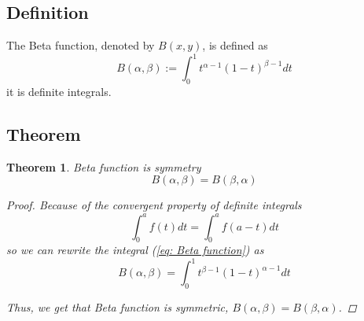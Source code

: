 \documentclass[a4paper]{article}
\newtheorem{theorem}{Theorem}[section]
\begin{document}
\subsection{Definition}
The Beta function, denoted by $B(x, y)$, is defined as
\begin{equation}
    B(\alpha, \beta) := \int_{0}^{1} t^{\alpha-1} (1-t)^{\beta-1} dt
    \label{eq: Beta function}
\end{equation}
it is definite integrals.

\subsection{Theorem}

\begin{theorem}
    Beta function is symmetry
    \begin{equation}
        B(\alpha, \beta) = B(\beta, \alpha)
    \end{equation}

    \begin{proof}
        Because of the convergent property of definite integrals
        \begin{equation*}
            \int_{0}^{a} f(t) dt = \int_{0}^{a} f(a-t) dt
        \end{equation*}
        so we can rewrite the integral (\ref{eq: Beta function}) as
        \begin{equation*}
            B(\alpha, \beta) = \int_{0}^{1} t^{\beta-1} (1-t)^{\alpha-1} dt
        \end{equation*}

        Thus, we get that Beta function is symmetric, $B(\alpha, \beta) = B(\beta, \alpha)$.
    \end{proof}

\end{theorem}
\end{document}

